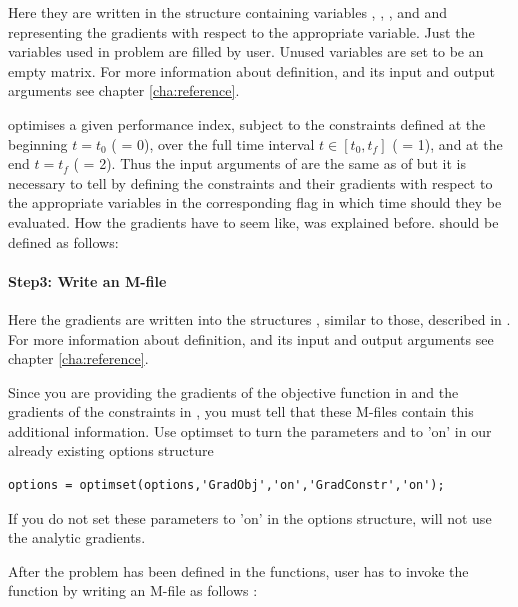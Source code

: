 {\small }

Here they are written in the structure  containing
variables , , , and  and
representing the gradients with respect to the appropriate
variable. Just the variables used in problem are filled by
user. Unused variables are set to be an empty matrix. For more
information about  definition, and its input and output
arguments see chapter \ref{cha:reference}. 

 optimises a given performance index, subject to the
constraints defined at the beginning $t =
t_{0}$ ( = 0), over the full time interval $t \in
[t_{0},t_{f}]$ ( = 1), and at the end $t = t_{f}$
( = 2). Thus the input arguments of  are the
same as of  but it is necessary to tell  by
defining the constraints and their gradients with respect to the
appropriate variables in the corresponding flag in which time should
they be evaluated. How the gradients have to seem like, was explained
before.  should be defined as follows:  
 
\paragraph{Step3: Write an M-file~}

{\small }

Here the gradients are written into the structures ,
 similar to those, described in . For more
information about  definition, and its input and output
arguments see chapter \ref{cha:reference}.

Since you are providing the gradients of the objective function in
 and the gradients of the constraints in
, you must tell  that these M-files
contain this additional information. Use optimset to turn the
parameters  and  to 'on' in our
already existing options structure 
\begin{verbatim}
options = optimset(options,'GradObj','on','GradConstr','on');
\end{verbatim}
If you do not set these parameters to 'on' in the options structure,
 will not use the analytic gradients.  

After the problem has been defined in the functions, user has to invoke
the  function by writing an M-file  as
follows :

